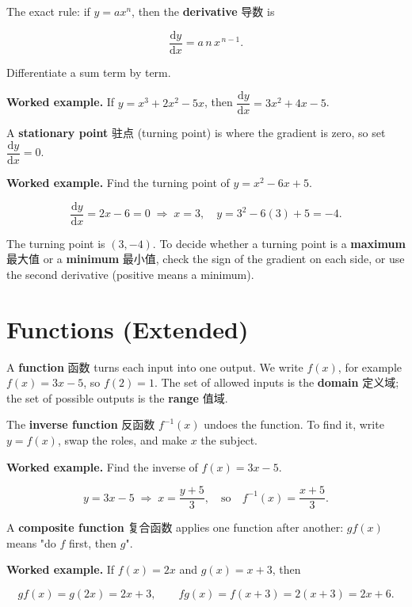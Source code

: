 \documentclass[11pt]{article}
\begin{document}
The exact rule: if $y = ax^{n}$, then the \textbf{derivative} 导数 is

\[
\frac{\mathrm{d}y}{\mathrm{d}x} = a\,n\,x^{\,n-1}.
\]

Differentiate a sum term by term.

\textbf{Worked example.} If $y = x^{3} + 2x^{2} - 5x$, then $\dfrac{\mathrm{d}y}{\mathrm{d}x} = 3x^{2} + 4x - 5$.

A \textbf{stationary point} 驻点 (turning point) is where the gradient is zero, so set $\dfrac{\mathrm{d}y}{\mathrm{d}x} = 0$.

\textbf{Worked example.} Find the turning point of $y = x^{2} - 6x + 5$.

\[
\frac{\mathrm{d}y}{\mathrm{d}x} = 2x - 6 = 0 \;\Rightarrow\; x = 3, \quad y = 3^{2} - 6(3) + 5 = -4.
\]

The turning point is $(3, -4)$. To decide whether a turning point is a \textbf{maximum} 最大值 or a \textbf{minimum} 最小值, check the sign of the gradient on each side, or use the second derivative (positive means a minimum).

\section*{Functions (Extended)}

A \textbf{function} 函数 turns each input into one output. We write $f(x)$, for example $f(x) = 3x - 5$, so $f(2) = 1$. The set of allowed inputs is the \textbf{domain} 定义域; the set of possible outputs is the \textbf{range} 值域.

The \textbf{inverse function} 反函数 $f^{-1}(x)$ undoes the function. To find it, write $y = f(x)$, swap the roles, and make $x$ the subject.

\textbf{Worked example.} Find the inverse of $f(x) = 3x - 5$.

\[
y = 3x - 5 \;\Rightarrow\; x = \frac{y + 5}{3}, \quad \text{so} \quad f^{-1}(x) = \frac{x + 5}{3}.
\]

A \textbf{composite function} 复合函数 applies one function after another: $gf(x)$ means "do $f$ first, then $g$".

\textbf{Worked example.} If $f(x) = 2x$ and $g(x) = x + 3$, then

\[
gf(x) = g(2x) = 2x + 3, \qquad fg(x) = f(x + 3) = 2(x + 3) = 2x + 6.
\]
\end{document}
